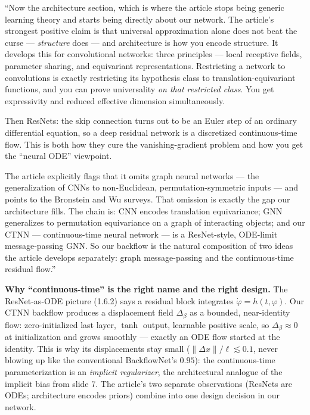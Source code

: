 \documentclass[11pt]{article}
\begin{document}
\begin{say}
``Now the architecture section, which is where the article stops being generic learning theory and
starts being directly about our network. The article's strongest positive claim is that universal
approximation alone does not beat the curse --- \emph{structure} does --- and architecture is how you
encode structure. It develops this for convolutional networks: three principles --- local receptive
fields, parameter sharing, and equivariant representations. Restricting a network to convolutions is
exactly restricting its hypothesis class to translation-equivariant functions, and you can prove
universality \emph{on that restricted class}. You get expressivity and reduced effective dimension
simultaneously.

Then ResNets: the skip connection turns out to be an Euler step of an ordinary differential equation,
so a deep residual network is a discretized continuous-time flow. This is both how they cure the
vanishing-gradient problem and how you get the ``neural ODE'' viewpoint.

The article explicitly flags that it omits graph neural networks --- the generalization of CNNs to
non-Euclidean, permutation-symmetric inputs --- and points to the Bronstein and Wu surveys. That
omission is exactly the gap our architecture fills. The chain is: CNN encodes translation
equivariance; GNN generalizes to permutation equivariance on a graph of interacting objects; and our
CTNN --- continuous-time neural network --- is a ResNet-style, ODE-limit message-passing GNN. So our
backflow is the natural composition of two ideas the article develops separately: graph
message-passing and the continuous-time residual flow.''
\end{say}

\begin{depth}
\textbf{Why ``continuous-time'' is the right name and the right design.} The ResNet-as-ODE picture
(1.6.2) says a residual block integrates $\dot\varphi=h(t,\varphi)$. Our CTNN backflow produces a
displacement field $\Delta_\beta$ as a bounded, near-identity flow: zero-initialized last layer,
$\tanh$ output, learnable positive scale, so $\Delta_\beta\approx 0$ at initialization and grows
smoothly --- exactly an ODE flow started at the identity. This is why its displacements stay small
($\|\Delta x\|/\ell\lesssim 0.1$, never blowing up like the conventional BackflowNet's $0.95$): the
continuous-time parameterization is an \emph{implicit regularizer}, the architectural analogue of the
implicit bias from slide 7. The article's two separate observations (ResNets are ODEs; architecture
encodes priors) combine into one design decision in our network.
\end{depth}
\end{document}
